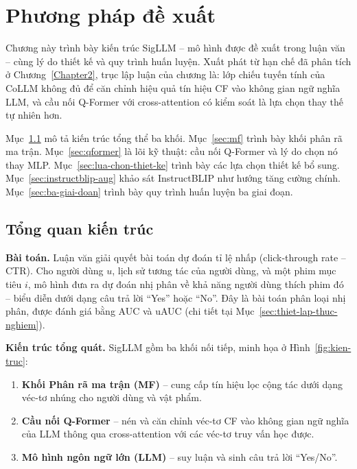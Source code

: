 \chapter{Phương pháp đề xuất}
\label{Chapter3}

Chương này trình bày kiến trúc SigLLM -- mô hình được đề xuất trong luận văn -- cùng
lý do thiết kế và quy trình huấn luyện. Xuất phát từ hạn chế đã phân tích ở
Chương~\ref{Chapter2}, trục lập luận của chương là: lớp chiếu tuyến tính của CoLLM không
đủ để căn chỉnh hiệu quả tín hiệu CF vào không gian ngữ nghĩa LLM, và cầu nối Q-Former
với cross-attention có kiểm soát là lựa chọn thay thế tự nhiên hơn.

Mục~\ref{sec:kien-truc-tong-quan} mô tả kiến trúc tổng thể ba khối.
Mục~\ref{sec:mf} trình bày khối phân rã ma trận. Mục~\ref{sec:qformer} là lõi kỹ thuật:
cầu nối Q-Former và lý do chọn nó thay MLP. Mục~\ref{sec:lua-chon-thiet-ke} trình bày
các lựa chọn thiết kế bổ sung. Mục~\ref{sec:instructblip-aug} khảo sát InstructBLIP như
hướng tăng cường chính. Mục~\ref{sec:ba-giai-doan} trình bày quy trình huấn luyện ba
giai đoạn.

\section{Tổng quan kiến trúc}
\label{sec:kien-truc-tong-quan}

\textbf{Bài toán.} Luận văn giải quyết bài toán dự đoán tỉ lệ nhấp (click-through rate
-- CTR). Cho người dùng $u$, lịch sử tương tác của người dùng, và một phim mục tiêu $i$,
mô hình đưa ra dự đoán nhị phân về khả năng người dùng thích phim đó -- biểu diễn dưới
dạng câu trả lời ``Yes'' hoặc ``No''. Đây là bài toán phân loại nhị phân, được đánh giá
bằng AUC và uAUC (chi tiết tại Mục~\ref{sec:thiet-lap-thuc-nghiem}).

\textbf{Kiến trúc tổng quát.} SigLLM gồm ba khối nối tiếp, minh họa ở
Hình~\ref{fig:kien-truc}:

\begin{enumerate}
    \item \textbf{Khối Phân rã ma trận (MF)} -- cung cấp tín hiệu lọc cộng tác dưới dạng
    véc-tơ nhúng cho người dùng và vật phẩm.

    \item \textbf{Cầu nối Q-Former} -- nén và căn chỉnh véc-tơ CF vào không gian ngữ nghĩa
    của LLM thông qua cross-attention với các véc-tơ truy vấn học được.

    \item \textbf{Mô hình ngôn ngữ lớn (LLM)} -- suy luận và sinh câu trả lời
    ``Yes/No''.
\end{enumerate}

